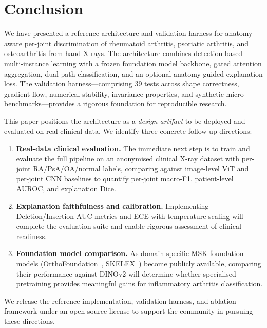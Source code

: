 \documentclass{article}
\begin{document}
\section{Conclusion}
\label{sec:conclusion}

We have presented a reference architecture and validation harness for anatomy-aware per-joint discrimination of rheumatoid arthritis, psoriatic arthritis, and osteoarthritis from hand X-rays. The architecture combines detection-based multi-instance learning with a frozen foundation model backbone, gated attention aggregation, dual-path classification, and an optional anatomy-guided explanation loss. The validation harness---comprising 39 tests across shape correctness, gradient flow, numerical stability, invariance properties, and synthetic micro-benchmarks---provides a rigorous foundation for reproducible research.

This paper positions the architecture as a \emph{design artifact} to be deployed and evaluated on real clinical data. We identify three concrete follow-up directions:

\begin{enumerate}
  \item \textbf{Real-data clinical evaluation.} The immediate next step is to train and evaluate the full pipeline on an anonymised clinical X-ray dataset with per-joint RA/PsA/OA/normal labels, comparing against image-level ViT and per-joint CNN baselines to quantify per-joint macro-F1, patient-level AUROC, and explanation Dice.
  \item \textbf{Explanation faithfulness and calibration.} Implementing Deletion/Insertion AUC metrics and ECE with temperature scaling will complete the evaluation suite and enable rigorous assessment of clinical readiness.
  \item \textbf{Foundation model comparison.} As domain-specific MSK foundation models (OrthoFoundation~\cite{orthofoundation2026}, SKELEX~\cite{skelex2026}) become publicly available, comparing their performance against DINOv2 will determine whether specialised pretraining provides meaningful gains for inflammatory arthritis classification.
\end{enumerate}

We release the reference implementation, validation harness, and ablation framework under an open-source license to support the community in pursuing these directions.
\end{document}
